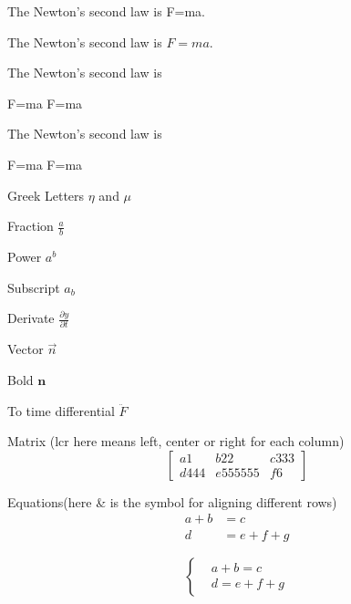 \documentclass[UTF8]{ctexart}
\begin{document}
   The Newton's second law is F=ma.

   The Newton's second law is $F=ma$.

   The Newton's second law is

F=ma
F=ma


   The Newton's second law is

F=ma
F=ma


   Greek Letters $\eta$ and $\mu$

   Fraction $\frac{a}{b}$

   Power $a^b$

   Subscript $a_b$

   Derivate $\frac{\partial y}{\partial t} $

   Vector $\vec{n}$

   Bold $\mathbf{n}$

   To time differential $\ddot{F}$

   Matrix (lcr here means left, center or right for each column)
   \[
     \left[
       \begin{array}{lcr}
         a1 & b22 & c333 \\
         d444 & e555555 & f6
       \end{array}
     \right]
   \]

Equations(here \& is the symbol for aligning different rows)
\begin{align}
   a+b&=c\\
   d&=e+f+g
\end{align}

\[
   \left\{
     \begin{aligned}
       &a+b=c\\
       &d=e+f+g
     \end{aligned}
   \right.
\]


\end{document}
